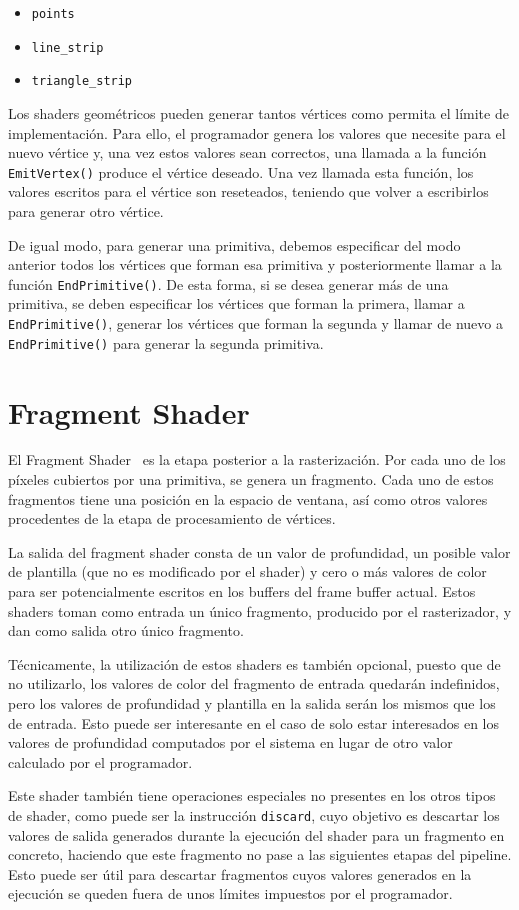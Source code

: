\begin{itemize}
		\item \verb|points|	
		\item \verb|line_strip|
		\item \verb|triangle_strip|
\end{itemize}

Los shaders geométricos pueden generar tantos vértices como permita el límite de
implementación. Para ello, el programador genera los valores que necesite para
el nuevo vértice y, una vez estos valores sean correctos, una llamada a la
función \verb|EmitVertex()| produce el vértice deseado. Una vez llamada esta
función, los valores escritos para el vértice son reseteados, teniendo que
volver a escribirlos para generar otro vértice. 

De igual modo, para generar una primitiva, debemos especificar del modo anterior
todos los vértices que forman esa primitiva y posteriormente llamar a la función
\verb|EndPrimitive()|. De esta forma, si se desea generar más de una primitiva,
se deben especificar los vértices que forman la primera, llamar a
\verb|EndPrimitive()|, generar los vértices que forman la segunda y llamar de
nuevo a \verb|EndPrimitive()| para generar la segunda primitiva.

\section{Fragment Shader}
\label{ref:FragShader}

El Fragment Shader~\cite{FragShader} es la etapa posterior a la rasterización.
Por cada uno de los píxeles cubiertos por una primitiva, se genera un fragmento.
Cada uno de estos fragmentos tiene una posición en la espacio de ventana, así
como otros valores procedentes de la etapa de procesamiento de vértices.

La salida del fragment shader consta de un valor de profundidad, un posible
valor de plantilla (que no es modificado por el shader) y cero o más valores de
color para ser potencialmente escritos en los buffers del frame buffer actual.
Estos shaders toman como entrada un único fragmento, producido por el
rasterizador, y dan como salida otro único fragmento. 

Técnicamente, la utilización de estos shaders es también opcional, puesto que de
no utilizarlo, los valores de color del fragmento de entrada quedarán
indefinidos, pero los valores de profundidad y plantilla en la salida serán los
mismos que los de entrada. Esto puede ser interesante en el caso de solo estar
interesados en los valores de profundidad computados por el sistema en lugar de
otro valor calculado por el programador. 

Este shader también tiene operaciones especiales no presentes en los otros tipos
de shader, como puede ser la instrucción \verb|discard|, cuyo objetivo es
descartar los valores de salida generados durante la ejecución del shader para
un fragmento en concreto, haciendo que este fragmento no pase a las siguientes
etapas del pipeline. Esto puede ser útil para descartar fragmentos cuyos valores
generados en la ejecución se queden fuera de unos límites impuestos por el
programador.

